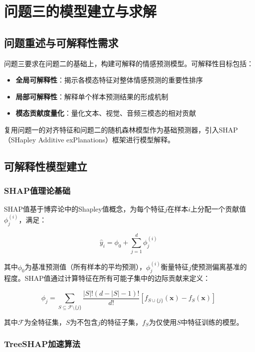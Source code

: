 \section{问题三的模型建立与求解}

\subsection{问题重述与可解释性需求}

问题三要求在问题二的基础上，构建可解释的情感预测模型。可解释性目标包括：
\begin{itemize}
\item \textbf{全局可解释性}：揭示各模态特征对整体情感预测的重要性排序
\item \textbf{局部可解释性}：解释单个样本预测结果的形成机制
\item \textbf{模态贡献度量化}：量化文本、视觉、音频三模态的相对贡献
\end{itemize}

复用问题一的对齐特征和问题二的随机森林模型作为基础预测器，引入SHAP（SHapley Additive exPlanations）框架进行模型解释。

\subsection{可解释性模型建立}

\subsubsection{SHAP值理论基础}

SHAP值基于博弈论中的Shapley值概念，为每个特征$j$在样本$i$上分配一个贡献值$\phi_j^{(i)}$，满足：

\begin{equation}
\hat{y}_i = \phi_0 + \sum_{j=1}^{d} \phi_j^{(i)}
\end{equation}

其中$\phi_0$为基准预测值（所有样本的平均预测），$\phi_j^{(i)}$衡量特征$j$使预测偏离基准的程度。SHAP值通过计算特征在所有可能子集中的边际贡献来定义：

\begin{equation}
\phi_j = \sum_{S \subseteq \mathcal{F} \setminus \{j\}} \frac{|S|!(d-|S|-1)!}{d!} \left[ f_{S \cup \{j\}}(\mathbf{x}) - f_S(\mathbf{x}) \right]
\end{equation}

其中$\mathcal{F}$为全特征集，$S$为不包含$j$的特征子集，$f_S$为仅使用$S$中特征训练的模型。

\subsubsection{TreeSHAP加速算法}

